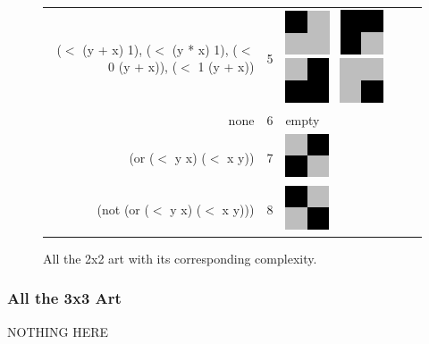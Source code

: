 \begin{figure}
\begin{center}
\begin{tabular}{r c l}
\tiny{($<$ (y + x) 1), ($<$ (y * x) 1), ($<$ 0 (y + x)), ($<$ 1 (y + x))} & 5 & 
    \includegraphics[width=.25in]{../presentation/2x2/Shape2LVL5.png}~
    \includegraphics[width=.25in]{../presentation/2x2/Shape1LVL5.png}~
    \includegraphics[width=.25in]{../presentation/2x2/Shape3LVL5.png}~
    \includegraphics[width=.25in]{../presentation/2x2/Shape4LVL5.png} \\
\tiny{none} & 6 & empty \\
\tiny{(or ($<$ y  x) ($<$ x  y))} & 7 &
    \includegraphics[width=.25in]{../presentation/2x2/Shape1LVL7.png}\\
\tiny{(not (or ($<$ y  x) ($<$ x  y)))} & 8 &
    \includegraphics[width=.25in]{../presentation/2x2/Shape1LVL8.png}
\end{tabular}
\end{center}

\caption{All the 2x2 art with its corresponding complexity.}
\label{fig:2x2}
\end{figure}


\subsubsection{All the 3x3 Art}

NOTHING HERE
